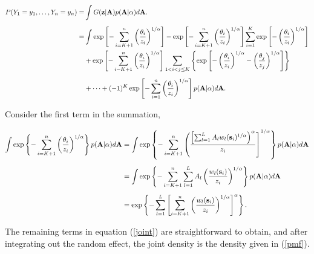 \documentclass[11pt]{article}
\begin{document}
\begin{align} \label{joint}
    P(Y_1=y_1,\ldots,Y_n=y_n) =&\int G(\mbox{\bf z} | \mbox{\bf A}) p( \mbox{\bf A} | \alpha) d\mbox{\bf A}. \nonumber\\[0.5em]
			=& \int \exp \left[ -\sum_{ i = K+1}^{ n }\left( \frac{ \theta_i }{ z_i } \right)^{1/\alpha} \right] - \exp \left[ -\sum_{ i = K+1}^{ n }\left( \frac{ \theta_i }{ z_i } \right)^{1/\alpha} \right] \sum_{ i = 1}^{K} \exp\left[ -\left( \frac{ \theta_i }{ z_i } \right)^{ 1/\alpha} \right] \nonumber\\
		&  + \exp \left[ -\sum_{ i = K+1}^{ n }\left( \frac{ \theta_i }{ z_i } \right)^{1/\alpha} \right] \sum_{ 1 < i < j \le K } \left\{ \exp \left[ - \left( \frac{ \theta_i }{ z_i } \right)^{ 1/\alpha} - \left( \frac{ \theta_j }{ z_j } \right)^{ 1/\alpha } \right] \right \} \nonumber \\[0.5em]
		& + \cdots + (-1)^K \exp\left[ - \sum_{ i = 1 }^{ n }\left( \frac{ \theta_i }{ z_i } \right)^{ 1/\alpha} \right] p( \mbox{\bf A} | \alpha) d\mbox{\bf A}.
\end{align}

Consider the first term in the summation,

\begin{align}
	\int \exp \left\{ -\sum_{ i = K+1}^{ n }\left( \frac{ \theta_i }{ z_i } \right)^{1/\alpha} \right\} p( \mbox{\bf A} | \alpha) d\mbox{\bf A} &= \int \exp \left\{ - \sum_{ i = K + 1 }^n \left( \frac{ \left[ \sum_{ l = 1 }^L  A_l w_{l}(\mbox{\bf s}_i)^{1/\alpha} \right)^\alpha }{ z_i} \right]^{ 1/\alpha } \right \} p( \mbox{\bf A} | \alpha) d\mbox{\bf A} \nonumber \\[0.5em]
	 &= \int \exp \left\{ -\sum_{ i = K + 1}^n \sum_{ l = 1}^L A_l \left( \frac{ w_l (\mbox{\bf s}_i) }{ z_i } \right)^{1/\alpha} \right \} p( \mbox{\bf A} | \alpha) d\mbox{\bf A} \nonumber \\[0.5em]
	 &=\exp\left\{-\sum_{ l = 1}^L \left[ \sum_{ i = K + 1 }^n \left( \frac{ w_l(\mbox{\bf s}_i)}{ z_i} \right)^{1/\alpha} \right]^\alpha \right\}.
\end{align}

The remaining terms in equation (\ref{joint}) are straightforward to obtain, and after integrating out the random effect, the joint density is the density given in (\ref{pmf}).
\end{document}
